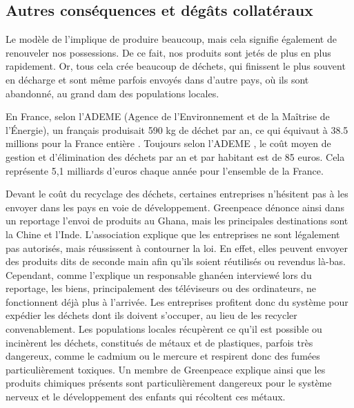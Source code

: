 \subsection{Autres conséquences et dégâts collatéraux}


Le modèle de l'\op implique de produire beaucoup, mais cela signifie également de renouveler nos possessions. De ce fait, nos produits sont jetés de plus en plus rapidement. Or, tous cela crée beaucoup de déchets, qui finissent le plus souvent en décharge et sont même parfois envoyés dans d'autre pays, où ils sont abandonné, au grand dam des populations locales.

\bigbreak En France, selon l'ADEME (Agence de l’Environnement et de la Maîtrise de l’Énergie), un français produisait 590 kg de déchet par an, ce qui équivaut à 38.5 millions pour la France entière \cite{ademeStat} . Toujours selon l'ADEME \cite{ADEMEprodDechetFR}, le coût moyen de gestion et d'élimination des déchets par an et par habitant est de 85 euros. Cela représente 5,1 milliards d'euros chaque année pour l'ensemble de la France.

\medbreak Devant le coût du recyclage des déchets, certaines entreprises n’hésitent pas à les envoyer dans les pays en voie de développement. Greenpeace dénonce ainsi dans un reportage \cite{GreenPeaceGhana} l'envoi de produits au Ghana, mais les principales destinations sont la Chine et l'Inde. L'association explique que les entreprises ne sont légalement pas autorisés, mais réussissent à contourner la loi. En effet, elles peuvent envoyer des produits dits de seconde main afin qu'ils soient réutilisés ou revendus là-bas. Cependant, comme l'explique un responsable ghanéen interviewé lors du reportage, les biens, principalement des téléviseurs ou des ordinateurs, ne fonctionnent déjà plus à l'arrivée. Les entreprises profitent donc du système pour expédier les déchets dont ils doivent s'occuper, au lieu de les recycler convenablement. Les populations locales récupèrent ce qu'il est possible ou incinèrent les déchets, constitués de métaux et de plastiques, parfois très dangereux, comme le cadmium ou le mercure et respirent donc des fumées particulièrement toxiques. Un membre de Greenpeace explique ainsi que les produits chimiques présents sont particulièrement dangereux pour le système nerveux et le développement des enfants qui récoltent ces métaux.


